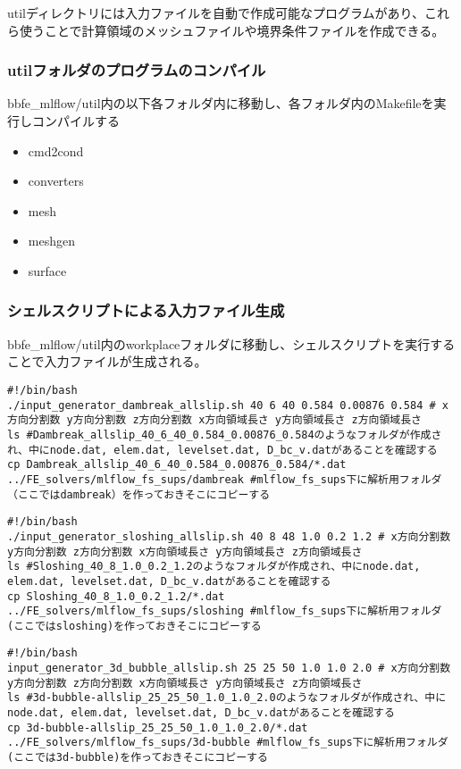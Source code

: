 utilディレクトリには入力ファイルを自動で作成可能なプログラムがあり、これら使うことで計算領域のメッシュファイルや境界条件ファイルを作成できる。

\subsubsection{utilフォルダのプログラムのコンパイル}
bbfe\_mlflow/util内の以下各フォルダ内に移動し、各フォルダ内のMakefileを実行しコンパイルする
\begin{itemize}
\item cmd2cond
\item converters
\item mesh
\item meshgen
\item surface
\end{itemize}

\subsubsection{シェルスクリプトによる入力ファイル生成}
bbfe\_mlflow/util内のworkplaceフォルダに移動し、シェルスクリプトを実行することで入力ファイルが生成される。

\begin{lstlisting}[caption = ダムブレイクの入力ファイル生成]
#!/bin/bash
./input_generator_dambreak_allslip.sh 40 6 40 0.584 0.00876 0.584 # x方向分割数 y方向分割数 z方向分割数 x方向領域長さ y方向領域長さ z方向領域長さ
ls #Dambreak_allslip_40_6_40_0.584_0.00876_0.584のようなフォルダが作成され、中にnode.dat, elem.dat, levelset.dat, D_bc_v.datがあることを確認する
cp Dambreak_allslip_40_6_40_0.584_0.00876_0.584/*.dat ../FE_solvers/mlflow_fs_sups/dambreak #mlflow_fs_sups下に解析用フォルダ（ここではdambreak）を作っておきそこにコピーする
\end{lstlisting}

\begin{lstlisting}[caption = スロッシングの入力ファイル生成]
#!/bin/bash
./input_generator_sloshing_allslip.sh 40 8 48 1.0 0.2 1.2 # x方向分割数 y方向分割数 z方向分割数 x方向領域長さ y方向領域長さ z方向領域長さ
ls #Sloshing_40_8_1.0_0.2_1.2のようなフォルダが作成され、中にnode.dat, elem.dat, levelset.dat, D_bc_v.datがあることを確認する
cp Sloshing_40_8_1.0_0.2_1.2/*.dat ../FE_solvers/mlflow_fs_sups/sloshing #mlflow_fs_sups下に解析用フォルダ(ここではsloshing)を作っておきそこにコピーする
\end{lstlisting}

\begin{lstlisting}[caption = 気泡上昇流れの入力ファイル生成]
#!/bin/bash
input_generator_3d_bubble_allslip.sh 25 25 50 1.0 1.0 2.0 # x方向分割数 y方向分割数 z方向分割数 x方向領域長さ y方向領域長さ z方向領域長さ
ls #3d-bubble-allslip_25_25_50_1.0_1.0_2.0のようなフォルダが作成され、中にnode.dat, elem.dat, levelset.dat, D_bc_v.datがあることを確認する
cp 3d-bubble-allslip_25_25_50_1.0_1.0_2.0/*.dat ../FE_solvers/mlflow_fs_sups/3d-bubble #mlflow_fs_sups下に解析用フォルダ(ここでは3d-bubble)を作っておきそこにコピーする
\end{lstlisting}

